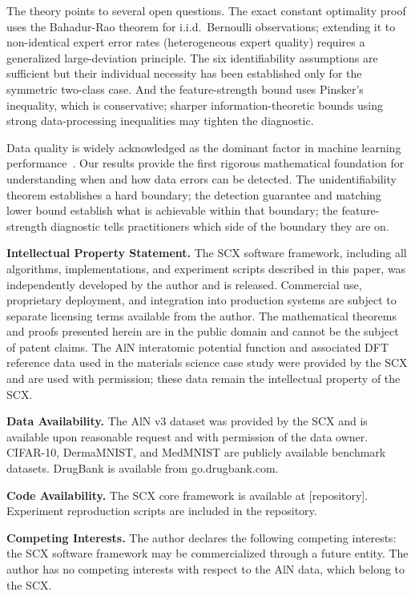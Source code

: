 \documentclass[12pt,a4paper]{article}
\theoremstyle{definition}
\theoremstyle{plain}
\theoremstyle{remark}
\begin{document}
The theory points to several open questions. The exact constant optimality proof uses the Bahadur-Rao theorem for i.i.d.\ Bernoulli observations; extending it to non-identical expert error rates (heterogeneous expert quality) requires a generalized large-deviation principle. The six identifiability assumptions are sufficient but their individual necessity has been established only for the symmetric two-class case. And the feature-strength bound uses Pinsker's inequality, which is conservative; sharper information-theoretic bounds using strong data-processing inequalities may tighten the diagnostic.

Data quality is widely acknowledged as the dominant factor in machine learning performance~\cite{sambasivan2021}. Our results provide the first rigorous mathematical foundation for understanding when and how data errors can be detected. The unidentifiability theorem establishes a hard boundary; the detection guarantee and matching lower bound establish what is achievable within that boundary; the feature-strength diagnostic tells practitioners which side of the boundary they are on.

\textbf{Intellectual Property Statement.}
The SCX software framework, including all algorithms, implementations, and experiment scripts described in this paper, was independently developed by the author and is released. Commercial use, proprietary deployment, and integration into production systems are subject to separate licensing terms available from the author. The mathematical theorems and proofs presented herein are in the public domain and cannot be the subject of patent claims. The AlN interatomic potential function and associated DFT reference data used in the materials science case study were provided by the SCX and are used with permission; these data remain the intellectual property of the SCX.

\textbf{Data Availability.}
The AlN v3 dataset was provided by the SCX and is available upon reasonable request and with permission of the data owner. CIFAR-10, DermaMNIST, and MedMNIST are publicly available benchmark datasets. DrugBank is available from go.drugbank.com.

\textbf{Code Availability.}
The SCX core framework is available at [repository]. Experiment reproduction scripts are included in the repository.

\textbf{Competing Interests.}
The author declares the following competing interests: the SCX software framework may be commercialized through a future entity. The author has no competing interests with respect to the AlN data, which belong to the SCX.
\end{document}
